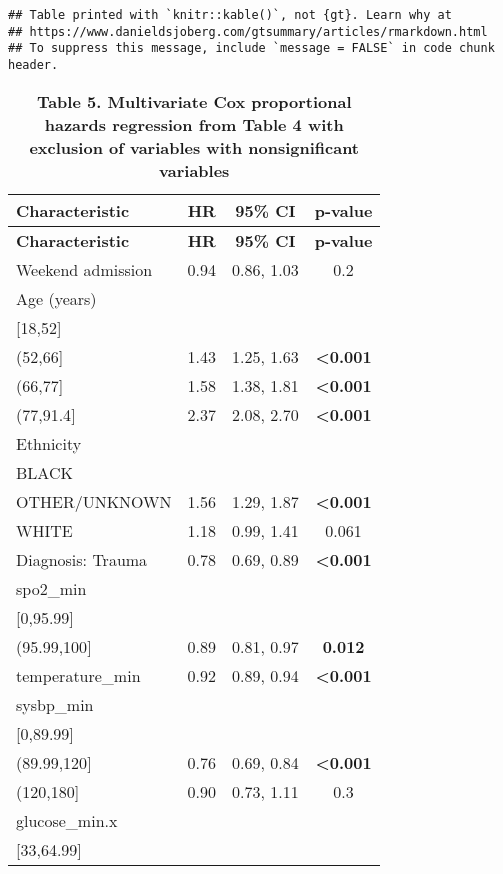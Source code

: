 \documentclass[
]{article}
\begin{document}
\begin{verbatim}
## Table printed with `knitr::kable()`, not {gt}. Learn why at
## https://www.danieldsjoberg.com/gtsummary/articles/rmarkdown.html
## To suppress this message, include `message = FALSE` in code chunk header.
\end{verbatim}

\begin{longtable}[]{@{}lccc@{}}
\caption{\textbf{Table 5. Multivariate Cox proportional hazards
regression from Table 4 with exclusion of variables with nonsignificant
variables}}\tabularnewline
\toprule\noalign{}
\textbf{Characteristic} & \textbf{HR} & \textbf{95\% CI} &
\textbf{p-value} \\
\midrule\noalign{}
\endfirsthead
\toprule\noalign{}
\textbf{Characteristic} & \textbf{HR} & \textbf{95\% CI} &
\textbf{p-value} \\
\midrule\noalign{}
\endhead
\bottomrule\noalign{}
\endlastfoot
Weekend admission & 0.94 & 0.86, 1.03 & 0.2 \\
Age (years) & & & \\
{[}18,52{]} & & & \\
(52,66{]} & 1.43 & 1.25, 1.63 & \textbf{\textless0.001} \\
(66,77{]} & 1.58 & 1.38, 1.81 & \textbf{\textless0.001} \\
(77,91.4{]} & 2.37 & 2.08, 2.70 & \textbf{\textless0.001} \\
Ethnicity & & & \\
BLACK & & & \\
OTHER/UNKNOWN & 1.56 & 1.29, 1.87 & \textbf{\textless0.001} \\
WHITE & 1.18 & 0.99, 1.41 & 0.061 \\
Diagnosis: Trauma & 0.78 & 0.69, 0.89 & \textbf{\textless0.001} \\
spo2\_min & & & \\
{[}0,95.99{]} & & & \\
(95.99,100{]} & 0.89 & 0.81, 0.97 & \textbf{0.012} \\
temperature\_min & 0.92 & 0.89, 0.94 & \textbf{\textless0.001} \\
sysbp\_min & & & \\
{[}0,89.99{]} & & & \\
(89.99,120{]} & 0.76 & 0.69, 0.84 & \textbf{\textless0.001} \\
(120,180{]} & 0.90 & 0.73, 1.11 & 0.3 \\
glucose\_min.x & & & \\
{[}33,64.99{]} & & & \\

\end{longtable}
\end{document}
